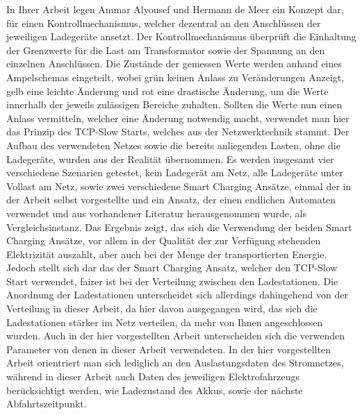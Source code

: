 In Ihrer Arbeit \cite{RW_3_1} legen  Ammar  Alyousef und Hermann de Meer ein Konzept dar, für einen Kontrollmechanismus, welcher dezentral an den Anschlüssen der jeweiligen Ladegeräte ansetzt. Der Kontrollmechanismus überprüft die Einhaltung der Grenzwerte für die Last am Transformator sowie der Spannung an den einzelnen Anschlüssen. Die Zustände der gemessen Werte werden anhand eines Ampelschemas eingeteilt, wobei grün keinen Anlass zu Veränderungen Anzeigt, gelb eine leichte Änderung und rot eine drastische Änderung, um die Werte innerhalb der jeweils zulässigen Bereiche zuhalten. Sollten die Werte nun einen Anlass vermitteln, welcher eine Änderung notwendig macht, verwendet man hier das Prinzip des TCP-Slow Starts, welches aus der Netzwerktechnik stammt. Der Aufbau des verwendeten Netzes sowie die bereits anliegenden Lasten, ohne die Ladegeräte, wurden aus der Realität übernommen. Es werden insgesamt vier verschiedene Szenarien getestet, kein Ladegerät am Netz, alle Ladegeräte unter Vollast am Netz, sowie zwei verschiedene Smart Charging Ansätze, einmal der in der Arbeit selbst vorgestellte und ein Ansatz, der einen endlichen Automaten verwendet und aus vorhandener Literatur herausgenommen wurde, als Vergleichsinstanz. Das Ergebnis zeigt, das sich die Verwendung der beiden Smart Charging Ansätze, vor allem in der Qualität der zur Verfügung stehenden Elektrizität auszahlt, aber auch bei der Menge der transportierten Energie. Jedoch stellt sich dar das der Smart Charging Ansatz, welcher den TCP-Slow Start verwendet, fairer ist bei der Verteilung zwischen den Ladestationen. Die Anordnung der Ladestationen unterscheidet sich allerdings dahingehend von der Verteilung in dieser Arbeit, da hier davon ausgegangen wird, das sich die Ladestationen stärker im Netz verteilen, da mehr von Ihnen angeschlossen wurden. Auch in der hier vorgestellten Arbeit unterscheiden sich die verwenden Parameter von denen in dieser Arbeit verwendeten. In der hier vorgestellten Arbeit orientriert man sich lediglich an den Auslastungsdaten des Stromnetzes, während in dieser Arbeit auch Daten des jeweiligen Elektrofahrzeugs berücksichtigt werden, wie Ladezustand des Akkus, sowie der nächste Abfahrtszeitpunkt. \\
